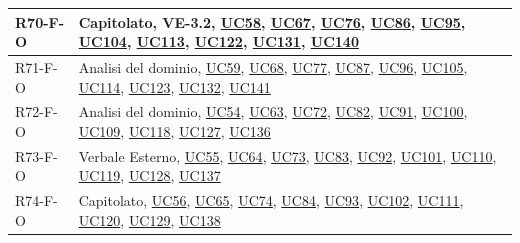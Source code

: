 \begin{longtable}{|p{2.8cm}|p{10.2cm}|}
	R70-F-O & Capitolato, VE-3.2, \hyperlink{uc58}{UC58}, \hyperlink{uc67}{UC67}, \hyperlink{uc76}{UC76}, \hyperlink{uc86}{UC86}, \hyperlink{uc95}{UC95}, \hyperlink{uc104}{UC104}, \hyperlink{uc113}{UC113}, \hyperlink{uc122}{UC122}, \hyperlink{uc131}{UC131}, \hyperlink{uc140}{UC140} \\ \hline
	R71-F-O & Analisi del dominio, \hyperlink{uc59}{UC59}, \hyperlink{uc68}{UC68}, \hyperlink{uc77}{UC77}, \hyperlink{uc87}{UC87}, \hyperlink{uc96}{UC96}, \hyperlink{uc105}{UC105}, \hyperlink{uc114}{UC114}, \hyperlink{uc123}{UC123}, \hyperlink{uc132}{UC132}, \hyperlink{uc141}{UC141} \\ \hline
	R72-F-O & Analisi del dominio, \hyperlink{uc54}{UC54}, \hyperlink{uc63}{UC63}, \hyperlink{uc72}{UC72}, \hyperlink{uc82}{UC82}, \hyperlink{uc91}{UC91}, \hyperlink{uc100}{UC100}, \hyperlink{uc109}{UC109}, \hyperlink{uc118}{UC118}, \hyperlink{uc127}{UC127}, \hyperlink{uc136}{UC136} \\ \hline
	R73-F-O & Verbale Esterno, \hyperlink{uc55}{UC55}, \hyperlink{uc64}{UC64}, \hyperlink{uc73}{UC73}, \hyperlink{uc83}{UC83}, \hyperlink{uc92}{UC92}, \hyperlink{uc101}{UC101}, \hyperlink{uc110}{UC110}, \hyperlink{uc119}{UC119}, \hyperlink{uc128}{UC128}, \hyperlink{uc137}{UC137} \\ \hline
	R74-F-O & Capitolato, \hyperlink{uc56}{UC56}, \hyperlink{uc65}{UC65}, \hyperlink{uc74}{UC74}, \hyperlink{uc84}{UC84}, \hyperlink{uc93}{UC93}, \hyperlink{uc102}{UC102}, \hyperlink{uc111}{UC111}, \hyperlink{uc120}{UC120}, \hyperlink{uc129}{UC129}, \hyperlink{uc138}{UC138} \\ \hline


\end{longtable}
